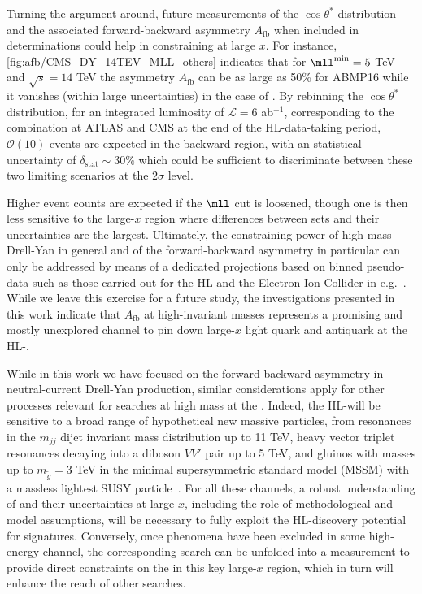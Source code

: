 Turning the argument around, future measurements of the $\cos\theta^*$
distribution and the associated forward-backward asymmetry 
$A_{\text{fb}}$ when included in \pdf determinations could help in
constraining \pdfs at large $x$.
%
For instance, \cref{fig:afb/CMS_DY_14TEV_MLL_others} indicates that for
$\mll^{\text{min}}=5$ TeV and $\sqrt{s}=14$ TeV the
asymmetry $A_{\text{fb}}$ can be as large as 50\% for ABMP16
while it vanishes (within large uncertainties) in the case of .
%
By rebinning the $\cos\theta^*$ distribution, for an integrated
luminosity of $\mathcal{L}=6$ ab$^{-1}$, corresponding to the
combination at ATLAS and CMS 
at the end of the HL-\lhc data-taking period, $\mathcal{O}(10)$ events are expected in the backward region,
with an statistical uncertainty of $\delta_{\text{stat}}\sim 30\%$ which could be sufficient to
discriminate between these two limiting scenarios at the $2\sigma$ level.

Higher event counts are expected if the $\mll$ cut is loosened, though one is
then less sensitive to the large-$x$ region where differences between \pdf sets and their
uncertainties are the largest.
%
Ultimately, the constraining power of high-mass Drell-Yan in general and of the forward-backward
asymmetry in particular can only be addressed by means of a dedicated projections
based on binned pseudo-data such as those carried
out for the HL-\lhc and the Electron Ion Collider in e.g.~\cite{AbdulKhalek:2018rok,Khalek:2021ulf}.
%
While we leave this exercise for a future study, the investigations
presented in this work indicate that $A_{\text{fb}}$
at high-invariant masses represents a promising and mostly
unexplored channel to pin down large-$x$ light
quark and antiquark \pdfs at the HL-\lhc.

While in this work
we have focused on the forward-backward asymmetry in neutral-current Drell-Yan production,
similar considerations apply for other processes relevant
for \bsm searches at high mass at the \lhc.
%
Indeed, the HL-\lhc will be sensitive to a broad range of hypothetical
new massive particles, from resonances in the $m_{jj}$ dijet invariant mass distribution up to 11 TeV,
heavy vector triplet resonances decaying into a diboson $VV'$ pair up to 5 TeV,
and gluinos with masses up to $m_{\tilde{g}}=3$ TeV in the minimal
supersymmetric standard model (MSSM) with a massless lightest SUSY
particle~\cite{CidVidal:2018eel}.
%
For all these channels, a robust understanding of \pdfs
and their uncertainties at large $x$, including the role of
methodological and model assumptions, will be necessary to fully exploit
the HL-\lhc discovery potential for \bsm signatures.
%
%
Conversely, once \bsm phenomena have been excluded in some high-energy channel,
the corresponding search can be unfolded into a measurement to provide direct
constraints on the \pdfs in this key large-$x$ region, which in turn will
enhance the reach of other searches.

